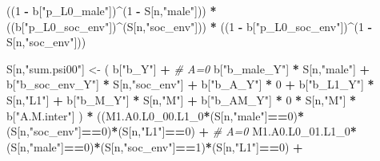 \documentclass[
]{book}
\newenvironment{Shaded}{\begin{snugshade}}{\end{snugshade}}
\newcommand{\CommentTok}[1]{\textcolor[rgb]{0.56,0.35,0.01}{\textit{#1}}}
\newcommand{\DecValTok}[1]{\textcolor[rgb]{0.00,0.00,0.81}{#1}}
\newcommand{\NormalTok}[1]{#1}
\newcommand{\OtherTok}[1]{\textcolor[rgb]{0.56,0.35,0.01}{#1}}
\newcommand{\SpecialCharTok}[1]{\textcolor[rgb]{0.81,0.36,0.00}{\textbf{#1}}}
\newcommand{\StringTok}[1]{\textcolor[rgb]{0.31,0.60,0.02}{#1}}
\begin{document}
\begin{Shaded}
\begin{Highlighting}[]
\NormalTok{      ((}\DecValTok{1} \SpecialCharTok{{-}}\NormalTok{ b[}\StringTok{"p\_L0\_male"}\NormalTok{])}\SpecialCharTok{\^{}}\NormalTok{(}\DecValTok{1} \SpecialCharTok{{-}}\NormalTok{ S[n,}\StringTok{"male"}\NormalTok{])) }\SpecialCharTok{*} 
\NormalTok{      ((b[}\StringTok{"p\_L0\_soc\_env"}\NormalTok{])}\SpecialCharTok{\^{}}\NormalTok{(S[n,}\StringTok{"soc\_env"}\NormalTok{])) }\SpecialCharTok{*}
\NormalTok{      ((}\DecValTok{1} \SpecialCharTok{{-}}\NormalTok{ b[}\StringTok{"p\_L0\_soc\_env"}\NormalTok{])}\SpecialCharTok{\^{}}\NormalTok{(}\DecValTok{1} \SpecialCharTok{{-}}\NormalTok{ S[n,}\StringTok{"soc\_env"}\NormalTok{])) }
    
\NormalTok{    S[n,}\StringTok{"sum.psi00"}\NormalTok{] }\OtherTok{\textless{}{-}}\NormalTok{  ( b[}\StringTok{"b\_Y"}\NormalTok{] }\SpecialCharTok{+}                                            \CommentTok{\# A=0}
\NormalTok{                             b[}\StringTok{"b\_male\_Y"}\NormalTok{] }\SpecialCharTok{*}\NormalTok{ S[n,}\StringTok{"male"}\NormalTok{] }\SpecialCharTok{+} 
\NormalTok{                             b[}\StringTok{"b\_soc\_env\_Y"}\NormalTok{] }\SpecialCharTok{*}\NormalTok{ S[n,}\StringTok{"soc\_env"}\NormalTok{] }\SpecialCharTok{+} 
\NormalTok{                             b[}\StringTok{"b\_A\_Y"}\NormalTok{] }\SpecialCharTok{*} \DecValTok{0} \SpecialCharTok{+} 
\NormalTok{                             b[}\StringTok{"b\_L1\_Y"}\NormalTok{] }\SpecialCharTok{*}\NormalTok{ S[n,}\StringTok{"L1"}\NormalTok{] }\SpecialCharTok{+}
\NormalTok{                             b[}\StringTok{"b\_M\_Y"}\NormalTok{] }\SpecialCharTok{*}\NormalTok{ S[n,}\StringTok{"M"}\NormalTok{] }\SpecialCharTok{+}
\NormalTok{                             b[}\StringTok{"b\_AM\_Y"}\NormalTok{] }\SpecialCharTok{*} \DecValTok{0} \SpecialCharTok{*}\NormalTok{ S[n,}\StringTok{"M"}\NormalTok{] }\SpecialCharTok{*}\NormalTok{ b[}\StringTok{"A.M.inter"}\NormalTok{] ) }\SpecialCharTok{*}
\NormalTok{      ((M1.A0.L0\_00.L1\_0}\SpecialCharTok{*}\NormalTok{(S[n,}\StringTok{"male"}\NormalTok{]}\SpecialCharTok{==}\DecValTok{0}\NormalTok{)}\SpecialCharTok{*}\NormalTok{(S[n,}\StringTok{"soc\_env"}\NormalTok{]}\SpecialCharTok{==}\DecValTok{0}\NormalTok{)}\SpecialCharTok{*}\NormalTok{(S[n,}\StringTok{"L1"}\NormalTok{]}\SpecialCharTok{==}\DecValTok{0}\NormalTok{) }\SpecialCharTok{+} \CommentTok{\# A\textquotesingle{}=0}
\NormalTok{          M1.A0.L0\_01.L1\_0}\SpecialCharTok{*}\NormalTok{(S[n,}\StringTok{"male"}\NormalTok{]}\SpecialCharTok{==}\DecValTok{0}\NormalTok{)}\SpecialCharTok{*}\NormalTok{(S[n,}\StringTok{"soc\_env"}\NormalTok{]}\SpecialCharTok{==}\DecValTok{1}\NormalTok{)}\SpecialCharTok{*}\NormalTok{(S[n,}\StringTok{"L1"}\NormalTok{]}\SpecialCharTok{==}\DecValTok{0}\NormalTok{) }\SpecialCharTok{+}

\end{Highlighting}
\end{Shaded}
\end{document}
